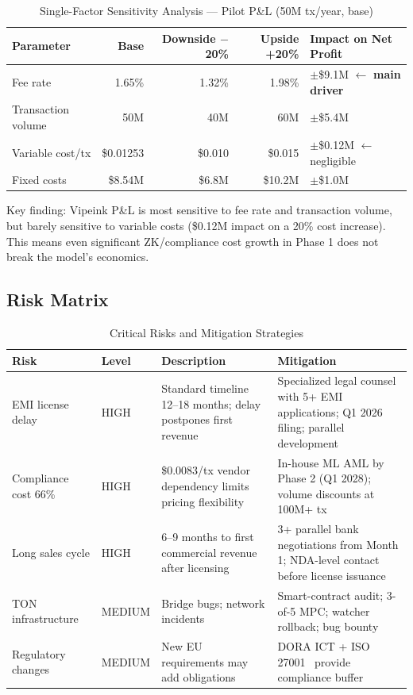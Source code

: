 \documentclass[11pt,a4paper]{article}
\begin{document}
\begin{table}[htbp]
\centering
\caption{Single-Factor Sensitivity Analysis --- Pilot P\&L (50M tx/year, base)}
\small
\begin{tabularx}{\linewidth}{@{}XRRRX@{}}
\toprule
\textbf{Parameter} & \textbf{Base} & \textbf{Downside $-$20\%} & \textbf{Upside +20\%} & \textbf{Impact on Net Profit} \\
\midrule
Fee rate               & 1.65\%   & 1.32\%   & 1.98\%  & $\pm$\$9.1M $\leftarrow$ \textbf{main driver} \\
Transaction volume     & 50M      & 40M      & 60M     & $\pm$\$5.4M \\
Variable cost/tx       & \$0.01253 & \$0.010 & \$0.015 & $\pm$\$0.12M $\leftarrow$ negligible \\
Fixed costs            & \$8.54M  & \$6.8M   & \$10.2M & $\pm$\$1.0M \\
\bottomrule
\end{tabularx}
\end{table}

Key finding: Vipeink P\&L is most sensitive to fee rate and transaction volume, but barely sensitive to variable costs (\$0.12M impact on a 20\% cost increase). This means even significant ZK/compliance cost growth in Phase 1 does not break the model's economics.

\subsection*{Risk Matrix}

\begin{table}[htbp]
\centering
\caption{Critical Risks and Mitigation Strategies}
\begin{tabularx}{\linewidth}{@{}p{3.2cm}p{1.4cm}XX@{}}
\toprule
\textbf{Risk} & \textbf{Level} & \textbf{Description} & \textbf{Mitigation} \\
\midrule
EMI license delay~\cite{lb_emi}      & \textcolor{warnred}{HIGH}        & Standard timeline 12--18 months; delay postpones first revenue  & Specialized legal counsel with 5+ EMI applications; Q1 2026 filing; parallel development \\[4pt]
Compliance cost 66\%~\cite{mckinsey_aml}   & \textcolor{warnred}{HIGH}        & \$0.0083/tx vendor dependency limits pricing flexibility         & In-house ML AML by Phase 2 (Q1 2028); volume discounts at 100M+ tx \\[4pt]
Long sales cycle       & \textcolor{warnred}{HIGH}        & 6--9 months to first commercial revenue after licensing          & 3+ parallel bank negotiations from Month 1; NDA-level contact before license issuance \\[4pt]
TON infrastructure~\cite{ton_wp}     & \textcolor{warnyellow}{MEDIUM} & Bridge bugs; network incidents & Smart-contract audit; 3-of-5 MPC; watcher rollback; bug bounty \\[4pt]
Regulatory changes~\cite{dora_reg,mica_reg}     & \textcolor{warnyellow}{MEDIUM} & New EU requirements may add obligations             & DORA ICT + ISO 27001~\cite{iso27001} provide compliance buffer \\
\bottomrule
\end{tabularx}
\end{table}
\end{document}
